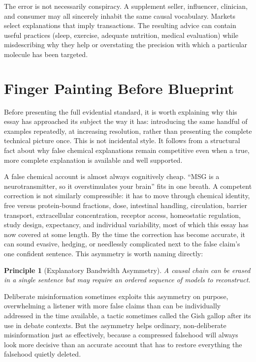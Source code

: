 \documentclass[11pt]{article}
\newtheorem*{principle}{Principle}
\begin{document}
The error is not necessarily conspiracy. A supplement seller, influencer, clinician, and consumer may all sincerely inhabit the same causal vocabulary. Markets select explanations that imply transactions. The resulting advice can contain useful practices (sleep, exercise, adequate nutrition, medical evaluation) while misdescribing why they help or overstating the precision with which a particular molecule has been targeted.

\section{Finger Painting Before Blueprint}

Before presenting the full evidential standard, it is worth explaining why this essay has approached its subject the way it has: introducing the same handful of examples repeatedly, at increasing resolution, rather than presenting the complete technical picture once. This is not incidental style. It follows from a structural fact about why false chemical explanations remain competitive even when a true, more complete explanation is available and well supported.

A false chemical account is almost always cognitively cheap. ``MSG is a neurotransmitter, so it overstimulates your brain'' fits in one breath. A competent correction is not similarly compressible: it has to move through chemical identity, free versus protein-bound fractions, dose, intestinal handling, circulation, barrier transport, extracellular concentration, receptor access, homeostatic regulation, study design, expectancy, and individual variability, most of which this essay has now covered at some length. By the time the correction has become accurate, it can sound evasive, hedging, or needlessly complicated next to the false claim's one confident sentence. This asymmetry is worth naming directly:

\begin{principle}[Explanatory Bandwidth Asymmetry]
A causal chain can be erased in a single sentence but may require an ordered sequence of models to reconstruct.
\end{principle}

Deliberate misinformation sometimes exploits this asymmetry on purpose, overwhelming a listener with more false claims than can be individually addressed in the time available, a tactic sometimes called the Gish gallop after its use in debate contexts. But the asymmetry helps ordinary, non-deliberate misinformation just as effectively, because a compressed falsehood will always look more decisive than an accurate account that has to restore everything the falsehood quietly deleted.
\end{document}
